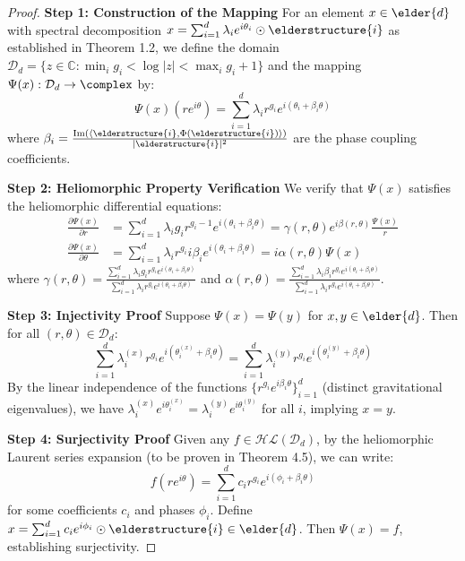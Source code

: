 \begin{proof}
\textbf{Step 1: Construction of the Mapping}
For an element $x \in \elder{d}$ with spectral decomposition $x = \sum_{i=1}^{d} \lambda_i e^{i\theta_i} \odot \elderstructure{i}$ as established in Theorem 1.2, we define the domain $\mathcal{D}_d = \{z \in \mathbb{C} : \min_i g_i < \log|z| < \max_i g_i + 1\}$ and the mapping $\Psi(x): \mathcal{D}_d \rightarrow \complex$ by:
\begin{equation}
\Psi(x)(re^{i\theta}) = \sum_{i=1}^{d} \lambda_i r^{g_i} e^{i(\theta_i + \beta_i \theta)}
\end{equation}
where $\beta_i = \frac{\text{Im}(\langle \elderstructure{i}, \Phi(\elderstructure{i}) \rangle)}{|\elderstructure{i}|^2}$ are the phase coupling coefficients.

\textbf{Step 2: Heliomorphic Property Verification}
We verify that $\Psi(x)$ satisfies the heliomorphic differential equations:
\begin{align}
\frac{\partial \Psi(x)}{\partial r} &= \sum_{i=1}^{d} \lambda_i g_i r^{g_i-1} e^{i(\theta_i + \beta_i \theta)} = \gamma(r,\theta) e^{i\beta(r,\theta)}\frac{\Psi(x)}{r} \\
\frac{\partial \Psi(x)}{\partial \theta} &= \sum_{i=1}^{d} \lambda_i r^{g_i} i\beta_i e^{i(\theta_i + \beta_i \theta)} = i\alpha(r,\theta)\Psi(x)
\end{align}
where $\gamma(r,\theta) = \frac{\sum_{i=1}^{d} \lambda_i g_i r^{g_i} e^{i(\theta_i + \beta_i \theta)}}{\sum_{i=1}^{d} \lambda_i r^{g_i} e^{i(\theta_i + \beta_i \theta)}}$ and $\alpha(r,\theta) = \frac{\sum_{i=1}^{d} \lambda_i \beta_i r^{g_i} e^{i(\theta_i + \beta_i \theta)}}{\sum_{i=1}^{d} \lambda_i r^{g_i} e^{i(\theta_i + \beta_i \theta)}}$.

\textbf{Step 3: Injectivity Proof}
Suppose $\Psi(x) = \Psi(y)$ for $x, y \in \elder{d}$. Then for all $(r,\theta) \in \mathcal{D}_d$:
$$\sum_{i=1}^{d} \lambda_i^{(x)} r^{g_i} e^{i(\theta_i^{(x)} + \beta_i \theta)} = \sum_{i=1}^{d} \lambda_i^{(y)} r^{g_i} e^{i(\theta_i^{(y)} + \beta_i \theta)}$$
By the linear independence of the functions $\{r^{g_i} e^{i\beta_i \theta}\}_{i=1}^d$ (distinct gravitational eigenvalues), we have $\lambda_i^{(x)} e^{i\theta_i^{(x)}} = \lambda_i^{(y)} e^{i\theta_i^{(y)}}$ for all $i$, implying $x = y$.

\textbf{Step 4: Surjectivity Proof}
Given any $f \in \mathcal{HL}(\mathcal{D}_d)$, by the heliomorphic Laurent series expansion (to be proven in Theorem 4.5), we can write:
$$f(re^{i\theta}) = \sum_{i=1}^{d} c_i r^{g_i} e^{i(\phi_i + \beta_i \theta)}$$
for some coefficients $c_i$ and phases $\phi_i$. Define $x = \sum_{i=1}^{d} c_i e^{i\phi_i} \odot \elderstructure{i} \in \elder{d}$. Then $\Psi(x) = f$, establishing surjectivity.


\end{proof}
